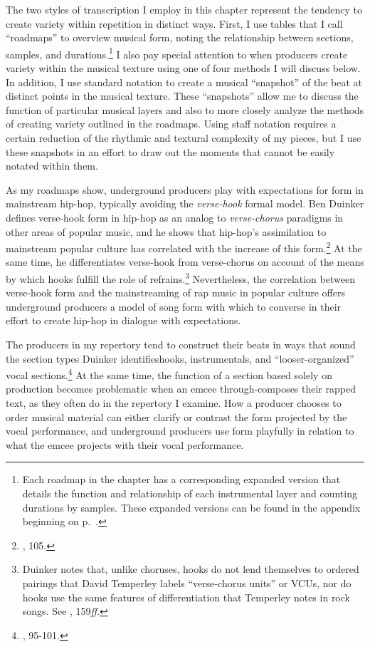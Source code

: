 The two styles of transcription I employ in this chapter represent the tendency to create variety within repetition in distinct ways. First, I use tables that I call ``roadmaps'' to overview musical form, noting the relationship between sections, samples, and durations.\footnote{Each roadmap in the chapter has a corresponding expanded version that details the function and relationship of each instrumental layer and counting durations by samples. These expanded versions can be found in the appendix beginning on p.~\pageref{appendix:fullroadmaps}.} I also pay special attention to when producers create variety within the musical texture using one of four methods I will discuss below. In addition, I use standard notation to create a musical ``snapshot'' of the beat at distinct points in the musical texture. These ``snapshots'' allow me to discuss the function of particular musical layers and also to more closely analyze the methods of creating variety outlined in the roadmaps. Using staff notation requires a certain reduction of the rhythmic and textural complexity of my pieces, but I use these snapshots in an effort to draw out the moments that cannot be easily notated within them.

As my roadmaps show, underground producers play with expectations for form in mainstream hip-hop, typically avoiding the \emph{verse-hook} formal model. Ben Duinker defines verse-hook form in hip-hop as an analog to \emph{verse-chorus} paradigms in other areas of popular music, and he shows that hip-hop's assimilation to mainstream popular culture has correlated with the increase of this form.\footnote{\cite{benduinkerSongFormMainstreaming2020}, 105.} At the same time, he differentiates verse-hook from verse-chorus on account of the means by which hooks fulfill the role of refrains.\footnote{Duinker notes that, unlike choruses, hooks do not lend themselves to ordered pairings that David Temperley labels ``verse-chorus units'' or VCUs, nor do hooks use the same features of differentiation that Temperley notes in rock songs. See \cite{davidtemperleyMusicalLanguageRock2018}, 159\textit{ff}.} Nevertheless, the correlation between verse-hook form and the mainstreaming of rap music in popular culture offers underground producers a model of song form with which to converse in their effort to create hip-hop in dialogue with expectations.

The producers in my repertory tend to construct their beats in ways that sound the section types Duinker identifies\textemdash  hooks, instrumentals, and ``looser-organized'' vocal sections.\footnote{\cite{benduinkerSongFormMainstreaming2020}, 95-101.} At the same time, the function of a section based solely on production becomes problematic when an emcee through-composes their rapped text, as they often do in the repertory I examine. How a producer chooses to order musical material can either clarify or contrast the form projected by the vocal performance, and underground producers use form playfully in relation to what the emcee projects with their vocal performance.

